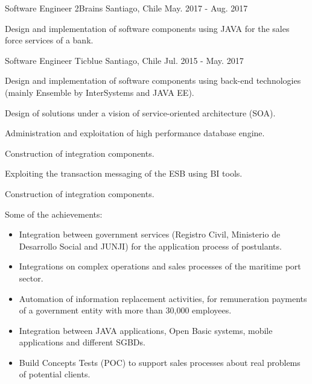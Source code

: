 \begin{cventries}
  \cventry
    {Software Engineer} %
    {2Brains} %
    {Santiago, Chile} %
    {May. 2017 - Aug. 2017} %
    {
      \begin{cvitems} %
        \item {Design and implementation of software components using JAVA for the sales force services of a bank.}
      \end{cvitems}
    }

  \cventry
    {Software Engineer} %
    {Ticblue} %
    {Santiago, Chile} %
    {Jul. 2015 - May. 2017} %
    {
      \begin{cvitems} %
        \item {Design and implementation of software components using back-end technologies (mainly Ensemble by InterSystems and JAVA EE).}
        \item {Design of solutions under a vision of service-oriented architecture (SOA).}
        \item {Administration and exploitation of high performance database engine.}
        \item {Construction of integration components.}
        \item {Exploiting the transaction messaging of the ESB using BI tools.}
        \item {Construction of integration components.}
        \item {Some of the achievements:}
        \begin{itemize}
        	\item{Integration between government services (Registro Civil, Ministerio de Desarrollo Social and JUNJI) for the application process of postulants.}
        	\item{Integrations on complex operations and sales processes of the maritime port sector.}
        	\item{Automation of information replacement activities, for remuneration payments of a government entity with more than 30,000 employees.}
        	\item{Integration between JAVA applications, Open Basic systems, mobile applications and different SGBDs.}
        	\item{Build Concepts Tests (POC) to support sales processes about real problems of potential clients.}        	
      	\end{itemize}
      \end{cvitems}
    }


\end{cventries}

